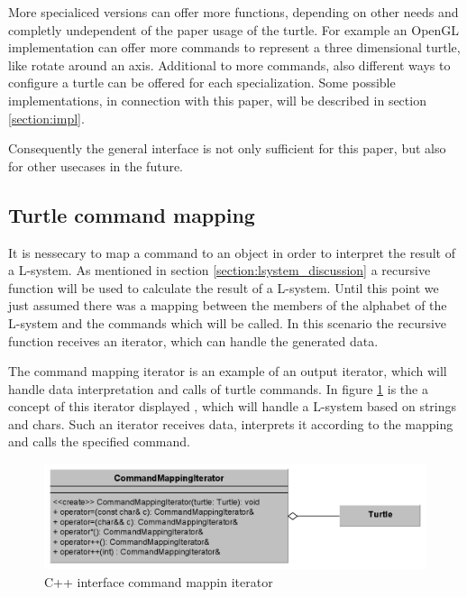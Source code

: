 \documentclass[english]{cpp-hmwk}
\begin{document}
\medskip
\noindent More specialiced versions can offer more functions, depending on other needs and completly undependent of the paper usage of the turtle. For example an OpenGL implementation can offer more commands to represent a three dimensional turtle, like rotate around an axis. Additional to more commands, also different ways to configure a turtle can be offered for each specialization. Some possible implementations, in connection with this paper, will be described in section \ref{section:impl}.

Consequently the general interface is not only sufficient for this paper, but also for other usecases in the future.

\subsection{Turtle command mapping}
\label{section:turtle_mapping}
It is nessecary to map a command to an object in order to interpret the result of a L-system. As mentioned in section \ref{section:lsystem_discussion} a recursive function will be used to calculate the result of a L-system. Until this point we just assumed there was a mapping between the members of the alphabet of the L-system and the commands which will be called. In this scenario the recursive function receives an iterator, which can handle the generated data. 

The command mapping iterator is an example of an output iterator, which will handle data interpretation and calls of turtle commands. In figure \ref{figure:if_command_map} is the a concept of this iterator displayed , which will handle a L-system based on strings and chars. Such an iterator receives data, interprets it according to the mapping and calls the specified command.

\begin{figure}[h!]
	\centering
	\includegraphics[width=1\columnwidth]{../graphs/LSystem/examples/class_command_mapping_iterator.png}
	\caption{C++ interface command mappin iterator}
	\label{figure:if_command_map}
\end{figure}
\end{document}

